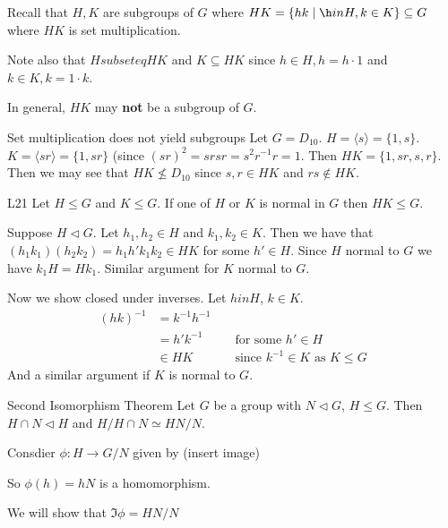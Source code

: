 \documentclass{article}
\begin{document}
Recall that $H, K$ are subgroups of $G$ where $HK = \{ hk \mid \h in H, k \in K \} \subseteq G$ where $HK$ is set multiplication. 

Note also that $H subseteq HK$ and $K \subseteq HK$ since $h \in H, h = h\cdot 1$ and $k \in K, k = 1\cdot k$. 

In general, $HK$ may \textbf{not} be a subgroup of $G$. 

\begin{cex}{Set multiplication does not yield subgroups}{}
    Let $G = D_{10}$. $H = \langle s \rangle = \{ 1,s \}$. $K = \langle sr \rangle = \{ 1, sr \}$ (since $(sr)^2 = srsr = s^2r^{-1}r = 1$. Then $HK = \{ 1, sr, s, r \}$. Then we may see that $HK \not\leq D_{10}$ since $s, r \in HK$ and $rs \not\in HK$. 
\end{cex}

\begin{clem}{L21}{}
    Let $H \leq G$ and $K \leq G$. If one of $H$ or $K$ is normal in $G$ then $HK \leq G$. 

    \begin{cpf}
        Suppose $H \triangleleft G$. Let $h_1, h_2 \in H$ and $k_1, k_2 \in K$. Then we have that $ \left( h_1k_1 \right) \left( h_2k_2 \right) = h_1h'k_1k_2 \in HK$ for some $h' \in H$. Since $H$ normal to $G$ we have $k_1H = Hk_1$. Similar argument for $K$ normal to $G$. 

        Now we show closed under inverses. Let $h in H$, $k \in K$. 
        \begin{align*}
            \left( hk \right)^{-1} & = k^{-1}h^{-1}\\
            & = h'k^{-1} && \text{ for some $h' \in H$}\\
            & \in HK && \text{ since $k^{-1} \in K$ as $K \leq G$}
        \end{align*}
        And a similar argument if $K$ is normal to $G$. 
    \end{cpf}
\end{clem}

\begin{cthm}{Second Isomorphism Theorem}{}
    Let $G$ be a group with $N \triangleleft G$, $H \leq G$. Then $H \cap N \triangleleft H$ and $H / H\cap N \simeq HN/N$. 


    \begin{cpf}
        Consdier $\phi: H \to G/N$ given by (insert image)

        So $\phi(h) = hN$ is a homomorphism. 

        We will show that $\Im{\phi} = HN/N$
    \end{cpf}
\end{cthm}
\end{document}
